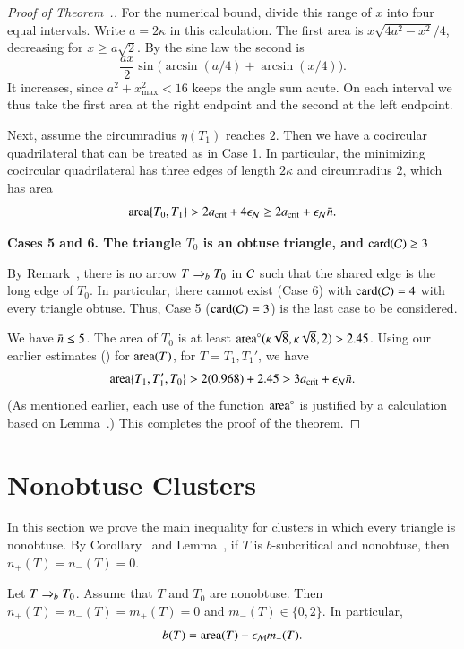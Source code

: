 \begin{proof}[Proof of Theorem~.]
For the numerical bound, divide this range of $x$ into four equal intervals. Write $a=2\kappa$ in this calculation.
The first area is $x\sqrt{4a^2-x^2}/4$, decreasing for
$x\ge a\sqrt2$. By the sine law the second is
\[
 \frac{ax}{2}\sin\bigl(\arcsin(a/4)+\arcsin(x/4)\bigr).
\]
It increases, since $a^2+x_{\max}^2<16$ keeps the angle sum acute.
On each interval we thus take the first area at the right endpoint
and the second at the left endpoint.

Next, assume the circumradius $\eta(T_1)$ reaches $2$. Then we
have a cocircular quadrilateral that can be treated as in Case 1.  In
particular, the minimizing cocircular quadrilateral has three edges of
length $2\kappa$ and circumradius $2$, which has area
\[
{\operatorname{area}}\{T_0,T_1\}
>  2a_\text{crit}+4\epsilon_{\mathcal N} \ge 2a_\text{crit}+\epsilon_{\mathcal N}\bar n.
\]

{\bf Cases 5 and 6. The triangle $T_0$ is an obtuse triangle, and
  ${\operatorname{card}}(\mathcal C)\ge3$} %

By Remark~, there is no arrow $T \Rightarrow_{b} T_0$ in $\mathcal C$
such that the shared edge is the long edge of $T_0$.  In particular,
there cannot exist (Case 6) with ${\operatorname{card}}(\mathcal C)=4$ with %
every triangle obtuse.  Thus, Case 5 (${\operatorname{card}}(\mathcal C)=3$) is the last case to be
considered.

We have $\bar n\le 5$.
The area of $T_0$ is at least
${\operatorname{area}}^\circ(\kappa\sqrt{8},\kappa\sqrt{8},2) > 2.45$.  
Using our earlier estimates ()
for ${\operatorname{area}}(T)$, for $T=T_1,T_1'$, we
have
\[
{\operatorname{area}}\{T_1,T_1',T_0\} > 2 (0.968) + 2.45 > 3a_\text{crit} + \epsilon_{\mathcal N}\bar n.
\] 
(As mentioned earlier, each use of the function ${\operatorname{area}}^\circ$ is justified
by a calculation based on Lemma~.)
This completes the proof of the theorem.
\end{proof}

\section{Nonobtuse Clusters}

In this section we prove the main inequality for clusters in which
every triangle is nonobtuse.  By Corollary~ and
Lemma~, if $T$ is $b$-subcritical and nonobtuse, then
$n_+(T)=n_-(T)=0$.

\begin{lemma}
  Let $T\Rightarrow_{b} T_0$. Assume that $T$ and $T_0$ are nonobtuse. Then
  $n_+(T)=n_-(T)=m_+(T)=0$ and $m_-(T)\in\{0,2\}$. In particular,
  \[
  b(T)={\operatorname{area}}(T)-\epsilon_{\mathcal M} m_-(T).
  \]
\end{lemma}

